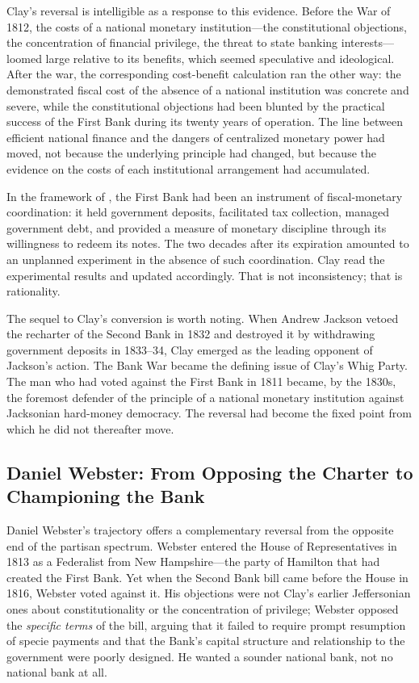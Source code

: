 \documentclass[12pt]{article}
\begin{document}
Clay's reversal is intelligible as a response to this evidence.  Before
the War of 1812, the costs of a national monetary institution---the
constitutional objections, the concentration of financial privilege, the
threat to state banking interests---loomed large relative to its
benefits, which seemed speculative and ideological.  After the war, the
corresponding cost-benefit calculation ran the other way: the
demonstrated fiscal cost of the absence of a national institution was
concrete and severe, while the constitutional objections had been blunted
by the practical success of the First Bank during its twenty years of
operation.  The line between efficient national finance and the dangers
of centralized monetary power had moved, not because the underlying
principle had changed, but because the evidence on the costs of each
institutional arrangement had accumulated.

In the framework of \citet{Sargent2011}, the First Bank had been an
instrument of fiscal-monetary coordination: it held government deposits,
facilitated tax collection, managed government debt, and provided a
measure of monetary discipline through its willingness to redeem its
notes.  The two decades after its expiration amounted to an unplanned
experiment in the absence of such coordination.  Clay read the
experimental results and updated accordingly.  That is not inconsistency;
that is rationality.

The sequel to Clay's conversion is worth noting.  When Andrew Jackson
vetoed the recharter of the Second Bank in 1832 and destroyed it by
withdrawing government deposits in 1833--34, Clay emerged as the leading
opponent of Jackson's action.  The Bank War became the defining issue
of Clay's Whig Party.  The man who had voted against the First Bank in
1811 became, by the 1830s, the foremost defender of the principle of a
national monetary institution against Jacksonian hard-money democracy.
The reversal had become the fixed point from which he did not thereafter
move.

\subsection{Daniel Webster: From Opposing the Charter to Championing
             the Bank}

Daniel Webster's trajectory offers a complementary reversal from the
opposite end of the partisan spectrum.  Webster entered the House of
Representatives in 1813 as a Federalist from New Hampshire---the party
of Hamilton that had created the First Bank.  Yet when the Second Bank
bill came before the House in 1816, Webster voted against it.  His
objections were not Clay's earlier Jeffersonian ones about
constitutionality or the concentration of privilege; Webster opposed the
\emph{specific terms} of the bill, arguing that it failed to require
prompt resumption of specie payments and that the Bank's capital
structure and relationship to the government were poorly designed.  He
wanted a sounder national bank, not no national bank at all.
\end{document}
